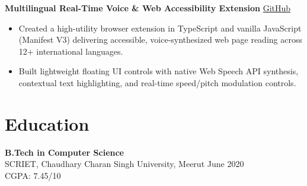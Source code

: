 \documentclass[10pt,a4paper]{article}
\newcommand{\projectheading}[3]{
  \textbf{#1} \hfill
  \href{#2}{#3}\\[-2pt]
}
\begin{document}
\medskip

\projectheading
  {Multilingual Real-Time Voice \& Web Accessibility Extension}
  {https://github.com/sakshi-labs/textToSpeech}
  {GitHub}

\begin{itemize}
  \item Created a high-utility browser extension in TypeScript and vanilla JavaScript (Manifest V3) delivering accessible, voice-synthesized web page reading across 12+ international languages.
  \item Built lightweight floating UI controls with native Web Speech API synthesis, contextual text highlighting, and real-time speed/pitch modulation controls.
\end{itemize}


\section{Education}

\textbf{B.Tech in Computer Science}\\
SCRIET, Chaudhary Charan Singh University, Meerut
\hfill June 2020\\
CGPA: 7.45/10
\end{document}
